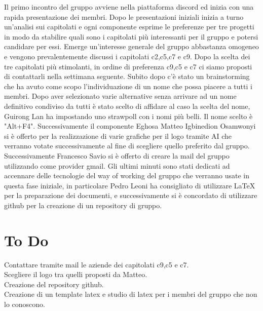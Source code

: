 \documentclass[a4paper, 12pt]{article}
\begin{document}
Il primo incontro del gruppo avviene nella piattaforma discord ed inizia con una rapida
presentazione dei membri.
Dopo le presentazioni iniziali inizia a turno un'analisi sui capitolati e ogni 
componente esprime le preferenze per tre progetti in modo da stabilire quali sono i capitolati più interessanti per il gruppo e potersi candidare per essi.
Emerge un'interesse generale del gruppo abbastanza omogeneo e vengono prevalentemente discussi i capitolati c2,c5,c7 e c9. Dopo la scelta dei tre capitolati più stimolanti, in ordine 
di preferenza c9,c5 e c7 ci siamo proposti di contattarli nella settimana seguente.
Subito dopo c'è stato un brainstorming che ha avuto come scopo l’individuazione di un nome che possa piacere a tutti i membri.
Dopo aver selezionato varie alternative senza arrivare ad un nome definitivo condiviso da tutti è stato scelto di affidare al caso la scelta del nome, Guirong Lan ha impostando uno strawpoll con i nomi più belli. Il nome scelto è "Alt+F4".
Successivamente il componente Eghosa Matteo Igbinedion Osamwonyi si è offerto per la realizzazione di varie grafiche per il logo tramite AI che verranno votate successivamente al fine di scegliere quello preferito dal gruppo.
Successivamente Francesco Savio si è offerto di creare la mail del gruppo utilizzando come provider gmail.
Gli ultimi minuti sono stati dedicati ad accennare delle tecnologie del way of working del gruppo che verranno usate in questa fase iniziale, in particolare Pedro Leoni ha consigliato di utilizzare LaTeX per la preparazione dei documenti, e successivamente si è concordato di utilizzare github per la creazione di un repository di gruppo.


\section{To Do}

Contattare tramite mail le aziende dei capitolati c9,c5 e c7.\\
Scegliere il logo tra quelli proposti da Matteo.\\
Creazione del repository github.\\
Creazione di un template latex e studio di latex per i membri del gruppo che non lo conoscono.\\
\end{document}
